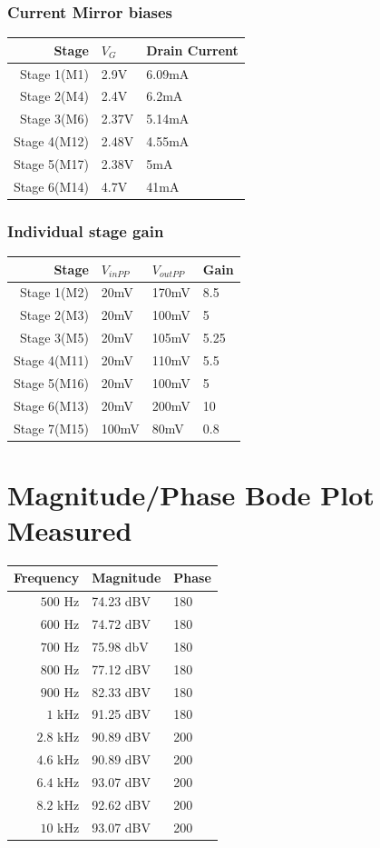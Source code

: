 \documentclass[11pt, twoside, letterpaper]{article}
\begin{document}
\subsubsection{Current Mirror biases}
\begin{tabular}{|r|l|l|}
\hline
Stage & $V_{G}$ & Drain Current\\
\hline
Stage 1(M1) &2.9V&6.09mA\\
Stage 2(M4) &2.4V&6.2mA\\
Stage 3(M6) &2.37V&5.14mA\\
Stage 4(M12) &2.48V&4.55mA\\
Stage 5(M17) &2.38V&5mA\\
Stage 6(M14) &4.7V&41mA\\
\hline
\end{tabular}
\FloatBarrier

\subsubsection{Individual stage gain }
\begin{tabular}{|r|l|l|l|}
\hline
Stage & $V_{inPP}$ & $V_{outPP}$ & Gain\\
\hline
Stage 1(M2)   & 20mV & 170mV & 8.5\\
Stage 2(M3)& 20mV & 100mV & 5\\
Stage 3(M5)& 20mV & 105mV & 5.25\\
Stage 4(M11) & 20mV & 110mV & 5.5\\
Stage 5(M16) & 20mV & 100mV & 5\\
Stage 6(M13) & 20mV & 200mV & 10\\
Stage 7(M15) & 100mV & 80mV & 0.8\\
\hline
\end{tabular}
\FloatBarrier


\section{Magnitude/Phase Bode Plot Measured}

\begin{tabular}{|r|l|l|}
\hline
Frequency & Magnitude & Phase\\
\hline
$500$ Hz & 74.23 dBV & 180 \\
$600$ Hz & 74.72 dBV & 180 \\
$700$ Hz & 75.98 dbV & 180 \\
$800$ Hz & 77.12 dBV & 180 \\
$900$ Hz & 82.33 dBV & 180 \\
$1$ kHz & 91.25 dBV & 180 \\
$2.8$ kHz & 90.89 dBV & 200 \\
$4.6$ kHz & 90.89 dBV & 200 \\
$6.4$ kHz& 93.07 dBV & 200 \\
$8.2$ kHz & 92.62 dBV & 200 \\
$10$  kHz& 93.07 dBV & 200 \\
\hline
\end{tabular}
\FloatBarrier
\end{document}
